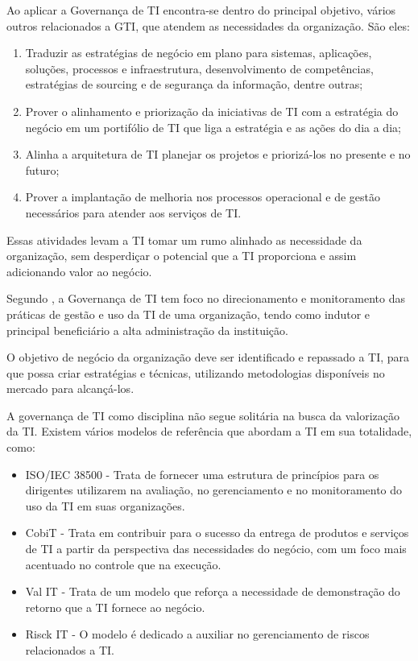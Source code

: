 Ao aplicar a Governança de TI encontra-se dentro do principal objetivo, vários outros relacionados a GTI, que atendem as necessidades da organização. São eles:  

\begin{enumerate}
\item Traduzir as estratégias de negócio em plano para sistemas, aplicações, soluções, processos e infraestrutura, desenvolvimento de competências, estratégias de sourcing e de segurança da informação, dentre outras;
\item Prover o alinhamento e priorização da iniciativas de TI com a estratégia do negócio em um portifólio de TI que liga a estratégia e as ações do dia a dia;
\item Alinha a arquitetura de TI planejar os projetos e priorizá-los no presente e no futuro;
\item Prover a implantação de melhoria nos processos operacional e de gestão necessários para atender aos serviços de TI.
\end{enumerate}

Essas atividades levam a TI tomar um rumo alinhado as necessidade da organização, sem desperdiçar o potencial que a TI proporciona e assim adicionando valor ao negócio.

Segundo \cite{GTI:TCU}, a Governança de TI tem foco no direcionamento e monitoramento das práticas de gestão e uso da TI de uma organização, tendo como indutor e principal beneficiário a alta administração da instituição.

O objetivo de negócio da organização deve ser identificado e repassado a TI, para que possa criar estratégias e técnicas, utilizando  metodologias disponíveis no mercado para alcançá-los. 

A governança de TI como disciplina não segue solitária na busca da valorização da TI. Existem vários modelos de referência que abordam a TI em sua totalidade, como:

 \begin{itemize}
 
 \item ISO/IEC 38500 - Trata de fornecer uma estrutura de princípios para os dirigentes utilizarem na avaliação, no gerenciamento e no monitoramento do uso da TI em suas organizações. 
 \item CobiT - Trata em contribuir para o sucesso da entrega de produtos e serviços de TI a partir da perspectiva das necessidades do negócio, com um foco mais acentuado no controle que na execução.
 \item Val IT - Trata de um modelo que reforça a necessidade de demonstração do retorno que a TI fornece ao negócio.
 \item Risck IT - O modelo é dedicado a auxiliar no gerenciamento de riscos relacionados a TI.
  
 \end{itemize}
 

